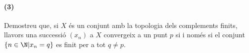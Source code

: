 \paragraph{(3)}
Demostreu que, si $X$ és un conjunt amb la topologia dels complements finits, llavors una successió $(x_n)$ a $X$ convergeix a un punt $p$ si i només si el conjunt $\{n \in \N | x_n = q \}$ es finit per a tot $q \neq p$.\\
